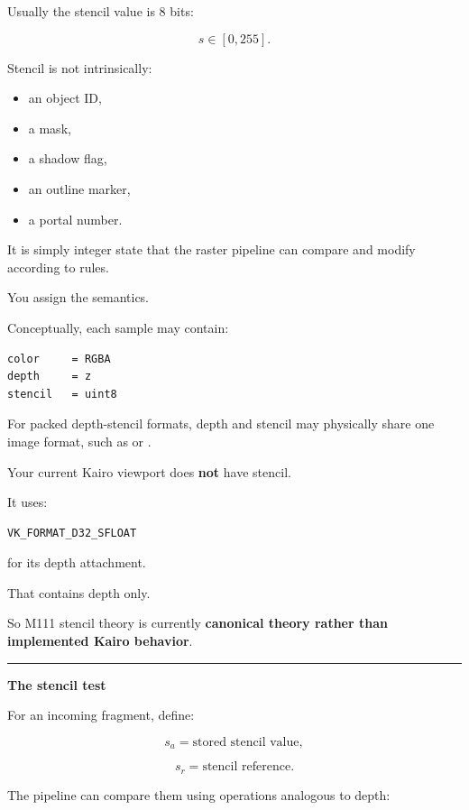 Usually the stencil value is 8 bits:

\[
s\in[0,255].
\]

Stencil is not intrinsically:

\begin{itemize}
\tightlist
\item
  an object ID,
\item
  a mask,
\item
  a shadow flag,
\item
  an outline marker,
\item
  a portal number.
\end{itemize}

It is simply integer state that the raster pipeline can compare and modify according to rules.

You assign the semantics.

Conceptually, each sample may contain:

\begin{verbatim}
color     = RGBA
depth     = z
stencil   = uint8
\end{verbatim}

For packed depth-stencil formats, depth and stencil may physically share one image format, such as  or .

Your current Kairo viewport does \textbf{not} have stencil.

It uses:

\begin{verbatim}
VK_FORMAT_D32_SFLOAT
\end{verbatim}

for its depth attachment.

That contains depth only.

So M111 stencil theory is currently \textbf{canonical theory rather than implemented Kairo behavior}.

\begin{center}\rule{0.5\linewidth}{0.5pt}\end{center}

\textbf{The stencil test}

For an incoming fragment, define:

\[
s_a = \text{stored stencil value},
\]

\[
s_r = \text{stencil reference}.
\]

The pipeline can compare them using operations analogous to depth:

